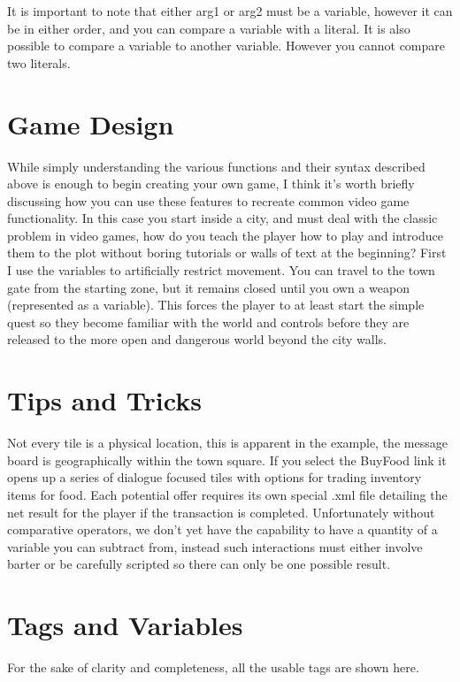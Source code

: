 \documentclass[11pt]{article}
\begin{document}
It is important to note that either arg1 or arg2 must be a variable, however it can be in either order, and you can compare a variable with a literal. It is also possible to compare a variable to another variable. However you cannot compare two literals.


\section{Game Design}

While simply understanding the various functions and their syntax described above is enough to begin creating your own game, I think it's worth briefly discussing how you can use these features to recreate common video game functionality. In this case you start inside a city, and must deal with the classic problem in video games, how do you teach the player how to play and introduce them to the plot without boring tutorials or walls of text at the beginning? First I use the variables to artificially restrict movement. You can travel to the town gate from the starting zone, but it remains closed until you own a weapon (represented as a variable). This forces the player to at least start the simple quest so they become familiar with the world and controls before they are released to the more open and dangerous world beyond the city walls. 

\section{Tips and Tricks}

Not every tile is a physical location, this is apparent in the example, the message board is geographically within the town square. If you select the BuyFood link it opens up a series of dialogue focused tiles with options for trading inventory items for food. Each potential offer requires its own special .xml file detailing the net result for the player if the transaction is completed. Unfortunately without comparative operators, we don't yet have the capability to have a quantity of a variable you can subtract from, instead such interactions must either involve barter or be carefully scripted so there can only be one possible result.

\section{Tags and Variables}

For the sake of clarity and completeness, all the usable tags are shown here. 
\end{document}
